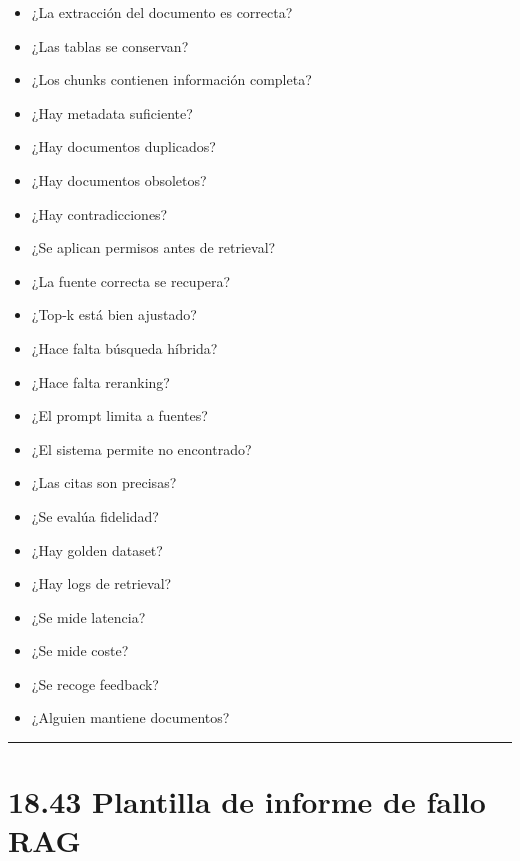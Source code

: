 \begin{itemize}
\tightlist
\item
  ¿La extracción del documento es correcta?
\item
  ¿Las tablas se conservan?
\item
  ¿Los chunks contienen información completa?
\item
  ¿Hay metadata suficiente?
\item
  ¿Hay documentos duplicados?
\item
  ¿Hay documentos obsoletos?
\item
  ¿Hay contradicciones?
\item
  ¿Se aplican permisos antes de retrieval?
\item
  ¿La fuente correcta se recupera?
\item
  ¿Top-k está bien ajustado?
\item
  ¿Hace falta búsqueda híbrida?
\item
  ¿Hace falta reranking?
\item
  ¿El prompt limita a fuentes?
\item
  ¿El sistema permite no encontrado?
\item
  ¿Las citas son precisas?
\item
  ¿Se evalúa fidelidad?
\item
  ¿Hay golden dataset?
\item
  ¿Hay logs de retrieval?
\item
  ¿Se mide latencia?
\item
  ¿Se mide coste?
\item
  ¿Se recoge feedback?
\item
  ¿Alguien mantiene documentos?
\end{itemize}

\begin{center}\rule{0.5\linewidth}{0.5pt}\end{center}

\section{18.43 Plantilla de informe de fallo
RAG}\label{plantilla-de-informe-de-fallo-rag}

